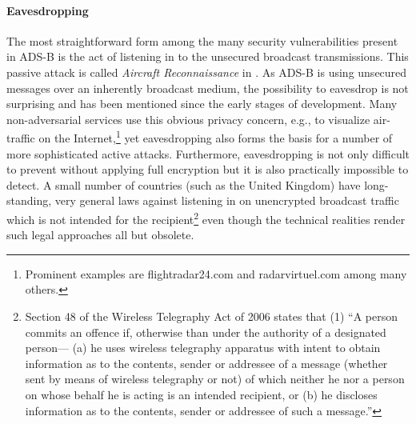 \documentclass[english]{IEEEtran}
\begin{document}
\paragraph*{Eavesdropping}

The most straightforward form among the many security vulnerabilities
present in ADS-B is the act of listening in to the unsecured broadcast
transmissions. This passive attack is called \emph{Aircraft Reconnaissance}
in \cite{McCallie2011}. As ADS-B is using unsecured messages over
an inherently broadcast medium, the possibility to eavesdrop is not
surprising and has been mentioned since the early stages of development.
Many non-adversarial services use this obvious privacy concern, e.g.,
to visualize air-traffic on the Internet,\footnote{Prominent examples are flightradar24.com and radarvirtuel.com among
many others.} yet eavesdropping also forms the basis for a number of more sophisticated
active attacks. Furthermore, eavesdropping is not only difficult to
prevent without applying full encryption but it is also practically
impossible to detect. A small number of countries (such as the United
Kingdom) have long-standing, very general laws against listening in
on unencrypted broadcast traffic which is not intended for the recipient\footnote{Section 48 of the Wireless Telegraphy Act of 2006 states that (1)
``A person commits an offence if, otherwise than under the authority
of a designated person— (a) he uses wireless telegraphy apparatus
with intent to obtain information as to the contents, sender or addressee
of a message (whether sent by means of wireless telegraphy or not)
of which neither he nor a person on whose behalf he is acting is an
intended recipient, or (b) he discloses information as to the contents,
sender or addressee of such a message.''} even though the technical realities render such legal approaches
all but obsolete.\\
\end{document}
